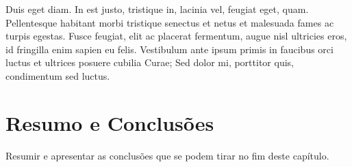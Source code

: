 Duis eget diam. In est justo, tristique in, lacinia vel, feugiat eget,
quam. Pellentesque habitant morbi tristique senectus et netus et
malesuada fames ac turpis egestas. Fusce feugiat, elit ac placerat
fermentum, augue nisl ultricies eros, id fringilla enim sapien eu
felis. Vestibulum ante ipsum primis in faucibus orci luctus et
ultrices posuere cubilia Curae; Sed dolor mi, porttitor quis,
condimentum sed luctus. 

\section{Resumo e Conclusões}

Resumir e apresentar as conclusões que se podem tirar no fim deste
capítulo.
